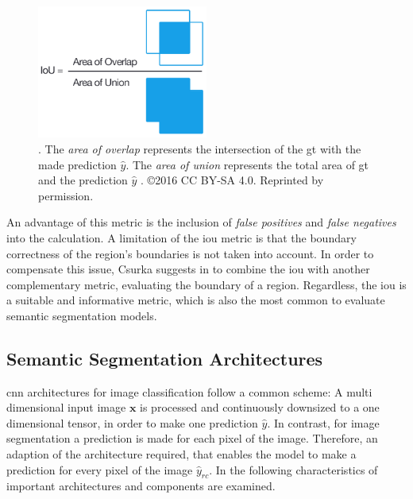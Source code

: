 \begin{figure} [!b]
	\centering
	\includegraphics[width=0.5\textwidth]{figures/chap222_iou.png}
	\caption[Intersection over Union]{
		. The \textit{area of overlap} represents the intersection of the \gls{gt} with the made prediction $\hat{y}$. 
		The \textit{area of union} represents the total area of \gls{gt} and the prediction $\hat{y}$ \cite{Sha18-DLCV}.
		\copyright 2016 CC BY-SA 4.0. Reprinted by permission.\footnotemark
	} \label{fig:ch2:sec2:iou}
\end{figure}

An advantage of this metric is the inclusion of \textit{false positives} and \textit{false negatives} into the calculation.
A limitation of the \gls{iou} metric is that the boundary correctness of the region's boundaries is not taken into account. 
In order to compensate this issue, Csurka suggests in \cite{Csu13-EvalMetric} to combine the \gls{iou} with another complementary metric, evaluating the boundary of a region.
Regardless, the \gls{iou} is a suitable and informative metric, which is also the most common to evaluate semantic segmentation models.



\subsection{Semantic Segmentation Architectures}\label{ord:ch2:sec2:subsec_arch}
\gls{cnn} architectures for image classification follow a common scheme: 
A multi dimensional input image $\textbf{x}$ is processed and continuously downsized to a one dimensional tensor, in order to make one prediction $\hat{y}$.
In contrast, for image segmentation a prediction is made for each pixel of the image.
Therefore, an adaption of the architecture required, that enables the model to make a prediction for every pixel of the image $\hat{y}_{rc}$.
In the following characteristics of important architectures and components are examined.

